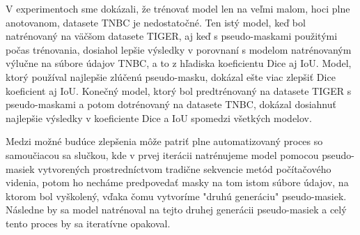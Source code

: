 V experimentoch sme dokázali, že trénovať model len na veľmi malom, hoci plne anotovanom, datasete TNBC je nedostatočné. Ten istý model, keď bol natrénovaný na väčšom datasete TIGER, aj keď s pseudo-maskami použitými počas trénovania, dosiahol lepšie výsledky v porovnaní s modelom natrénovaným výlučne na súbore údajov TNBC, a to z hľadiska koeficientu Dice aj IoU. Model, ktorý používal najlepšie zlúčenú pseudo-masku, dokázal ešte viac zlepšiť Dice koeficient aj IoU. Konečný model, ktorý bol predtrénovaný na datasete TIGER s pseudo-maskami a potom dotrénovaný na datasete TNBC, dokázal dosiahnuť najlepšie výsledky v koeficiente Dice a IoU spomedzi všetkých modelov.

Medzi možné budúce zlepšenia môže patriť plne automatizovaný proces so samoučiacou sa slučkou, kde v prvej iterácii natrénujeme model pomocou pseudo-masiek vytvorených prostredníctvom tradične sekvencie metód počítačového videnia, potom ho necháme predpovedať masky na tom istom súbore údajov, na ktorom bol vyškolený, vďaka čomu vytvoríme "druhú generáciu" pseudo-masiek. Následne by sa model natrénoval na tejto druhej generácii pseudo-masiek a celý tento proces by sa iteratívne opakoval.
